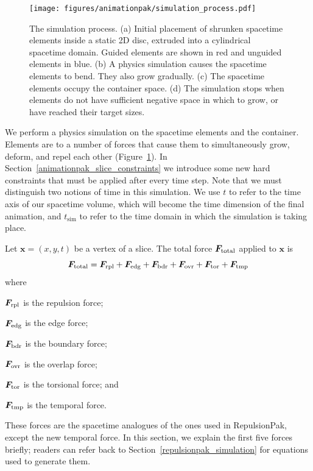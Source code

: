 \begin{figure}
\vspace{-20pt}
\centering
\texttt{[image: figures/animationpak/simulation\_process.pdf]} 
\caption[An illustration of the AnimationPak simulation process]{
\label{fig_animationpak_simulation_process} The simulation process. 
(a) Initial placement of 
shrunken spacetime elements inside a static 2D disc, extruded into a 
cylindrical spacetime domain.
Guided elements are shown in red and unguided elements in blue.
(b) A physics simulation causes the spacetime elements to bend. They
also grow gradually.
(c) The spacetime elements occupy the container space.
(d) The simulation stops when elements do not have sufficient negative
space in which to grow, or have reached their target sizes.
}
\end{figure}

\newtext
{
We perform a physics simulation on the spacetime elements and the 
container.  Elements are  to a number of forces that cause them
to simultaneously grow, deform, and repel each other (Figure~\ref{fig_animationpak_simulation_process}).
In Section~\ref{animationpak_slice_constraints} we introduce some new hard
constraints that must be applied after every time step.
Note that we must distinguish two notions of time in this simulation.  We use
$t$ to refer to the time axis of our spacetime volume, which will become
the time dimension of the final animation, and $t_\mathrm{sim}$ to
refer to the time domain in which the simulation is taking place.
}

\newtext
{
Let $\bm{x} = (x, y, t)$ be a vertex of a slice.
The total force $\bm{F}_\mathrm{total} $ applied to $\bm{x}$ is
\begin{equation}
\bm{F}_\mathrm{total}  = \bm{F}_\mathrm{rpl} + \bm{F}_\mathrm{edg} + \bm{F}_\mathrm{bdr} + \bm{F}_\mathrm{ovr} + \bm{F}_\mathrm{tor} + \bm{F}_\mathrm{tmp}
\end{equation}
where 
\begin{packeddescriptions}
  \item[$\bm{F}_\mathrm{rpl}$] is the repulsion force;
  \item[$\bm{F}_\mathrm{edg}$] is the edge force;
  \item[$\bm{F}_\mathrm{bdr}$] is the boundary force;
  \item[$\bm{F}_\mathrm{ovr}$] is the overlap force;
  \item[$\bm{F}_\mathrm{tor}$] is the torsional force; and 
  \item[$\bm{F}_\mathrm{tmp}$] is the temporal force.  
\end{packeddescriptions}
These forces are the spacetime analogues of the ones used in RepulsionPak, except the new temporal force.
In this section, we explain the first five forces briefly;
readers can refer back to Section~\ref{repulsionpak_simulation}
for equations used to generate them.
}



